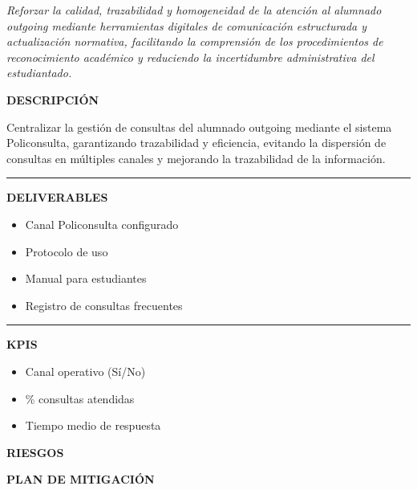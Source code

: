 \documentclass[11pt,a4paper]{scrreprt}
\newcommand{\fieldlabel}[1]{%
  {\footnotesize\sffamily\bfseries\color{mutedcolor}\MakeUppercase{#1}}\par\nopagebreak[4]
}
\newcommand{\fieldsep}{\vspace{3pt}\noindent\textcolor{bordercolor}{\rule{\linewidth}{0.4pt}}\vspace{3pt}\par}
\begin{document}
\newpage
{}
{\small\color{mutedcolor}\itshape Reforzar la calidad, trazabilidad y homogeneidad de la atención al alumnado outgoing mediante herramientas digitales de comunicación estructurada y actualización normativa, facilitando la comprensión de los procedimientos de reconocimiento académico y reduciendo la incertidumbre administrativa del estudiantado. }\par\vspace{6pt}

\begin{tcolorbox}[pabox={fgcolor}{PA2.1 \enspace\textbullet\enspace Implantación de Policonsulta como herramienta de comunicación}]

\fieldlabel{Descripci\'on}
{\small Centralizar la gestión de consultas del alumnado outgoing mediante el sistema Policonsulta, garantizando trazabilidad y eficiencia, evitando la dispersión de consultas en múltiples canales y mejorando la trazabilidad de la información. }\par
\fieldsep
\fieldlabel{Deliverables}
{\small \begin{itemize}[noitemsep,topsep=2pt]
\item Canal Policonsulta configurado
\item Protocolo de uso
\item Manual para estudiantes
\item Registro de consultas frecuentes
\end{itemize}}\par
\fieldsep
\fieldlabel{KPIs}
{\small \begin{itemize}[noitemsep,topsep=2pt]
\item Canal operativo (Sí/No)
\item \% consultas atendidas
\item Tiempo medio de respuesta
\end{itemize}}\par
\end{tcolorbox}
\begin{tcolorbox}[riskbox]
{\footnotesize\sffamily\bfseries\color{red!50!black} RIESGOS}\par{}
\end{tcolorbox}
\begin{tcolorbox}[mitbox]
{\footnotesize\sffamily\bfseries\color{green!40!black} PLAN DE MITIGACI\'ON}\par{}
\end{tcolorbox}
\vspace{8pt}
\end{document}
